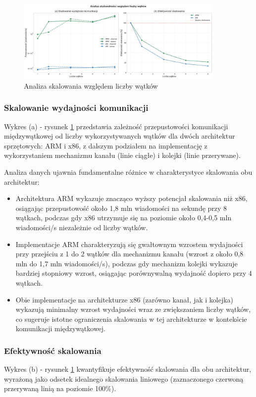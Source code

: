 \begin{figure}[H]
    \centering
    \includegraphics[width=0.9\textwidth]{analiza/images/conc/pc/compare/rysunek_2_skalowanie_watkow.png}
    \caption{Analiza skalowania względem liczby wątków}
    \label{rysunek_2_skalowanie_watkow}
\end{figure}
\subsubsection{Skalowanie wydajności komunikacji}
Wykres (a) - rysunek \ref{rysunek_2_skalowanie_watkow} przedstawia zależność przepustowości komunikacji międzywątkowej od liczby wykorzystywanych wątków dla dwóch architektur sprzętowych: ARM i x86, z dalszym podziałem na implementację z wykorzystaniem mechanizmu kanału (linie ciągłe) i kolejki (linie przerywane).

Analiza danych ujawnia fundamentalne różnice w charakterystyce skalowania obu architektur:
\begin{itemize}
    \item Architektura ARM wykazuje znacząco wyższy potencjał skalowania niż x86, osiągając przepustowość około 1,8 mln wiadomości na sekundę przy 8 wątkach, podczas gdy x86 utrzymuje się na poziomie około 0,4-0,5 mln wiadomości/s niezależnie od liczby wątków.
    \item Implementacje ARM charakteryzują się gwałtownym wzrostem wydajności przy przejściu z 1 do 2 wątków dla mechanizmu kanału (wzrost z około 0,8 mln do 1,7 mln wiadomości/s), podczas gdy mechanizm kolejki wykazuje bardziej stopniowy wzrost, osiągając porównywalną wydajność dopiero przy 4 wątkach.
    \item Obie implementacje na architekturze x86 (zarówno kanał, jak i kolejka) wykazują minimalny wzrost wydajności wraz ze zwiększaniem liczby wątków, co sugeruje istotne ograniczenia skalowania w tej architekturze w kontekście komunikacji międzywątkowej.
\end{itemize}

\subsubsection{Efektywność skalowania}
Wykres (b) - rysunek \ref{rysunek_2_skalowanie_watkow} kwantyfikuje efektywność skalowania dla obu architektur, wyrażoną jako odsetek idealnego skalowania liniowego (zaznaczonego czerwoną przerywaną linią na poziomie 100\%).

